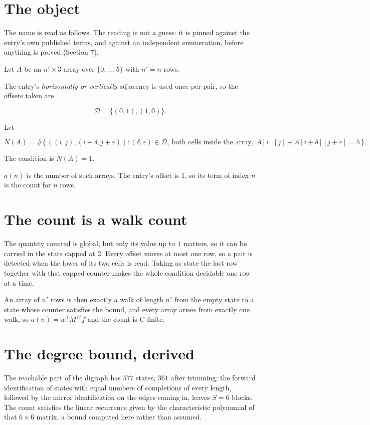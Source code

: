 \documentclass[11pt]{article}
\theoremstyle{definition}
\begin{document}
\section{The object}

The name is read as follows. The reading is not a guess: it is pinned against the entry's own published terms, and against an independent enumeration, before anything is proved (Section 7).

Let $A$ be an $n' \times 3$ array over $\{0,\dots,5\}$ with $n' = n$ rows.

The entry's {\itshape horizontally or vertically} adjacency is used once per pair, so the offsets taken are

\[\mathcal{D} = \{(0,1), (1,0)\}.\]

Let

\[N(A) = \#\bigl\{\,((i,j),(i{+}\delta,j{+}\varepsilon)) : (\delta,\varepsilon) \in \mathcal{D},\ \text{both cells inside the array},\ A[i][j] + A[i{+}\delta][j{+}\varepsilon] = 5\,\bigr\}.\]

The condition is $N(A) = 1$.

$a(n)$ is the number of such arrays. The entry's offset is 1, so its term of index $n$ is the count for $n$ rows.

\section{The count is a walk count}

The quantity counted is global, but only its value up to $1$ matters, so it can be carried in the state capped at $2$. Every offset moves at most one row, so a pair is detected when the lower of its two cells is read. Taking as state the last row together with that capped counter makes the whole condition decidable one row at a time.

An array of $n'$ rows is then exactly a walk of length $n'$ from the empty state to a state whose counter satisfies the bound, and every array arises from exactly one walk, so $a(n) = w^{\mathsf T}M^{\,n'}f$ and the count is C-finite.

\section{The degree bound, derived}

The reachable part of the digraph has $577$ states, $361$ after trimming; the forward identification of states with equal numbers of completions of every length, followed by the mirror identification on the edges coming in, leaves $S = 6$ blocks. The count satisfies the linear recurrence given by the characteristic polynomial of that $6\times6$ matrix, a bound computed here rather than assumed.
\end{document}

